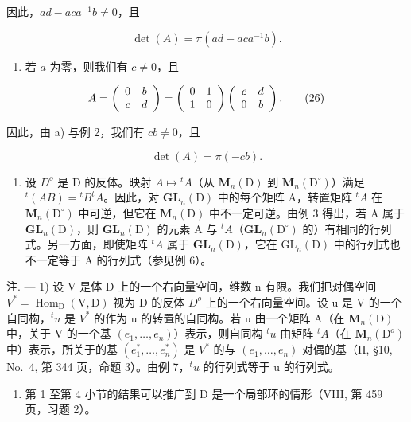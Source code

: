 因此，\(ad - aca^{-1}b \neq 0\)，且

\[
\det (A) = \pi (a d - a c a ^ {- 1} b).\tag{25}
\]

\begin{enumerate}
\def\labelenumi{\alph{enumi})}
\setcounter{enumi}{1}
\tightlist
\item
  若 \(a\) 为零，则我们有 \(c \neq 0\)，且
\end{enumerate}

\[
A = \left( \begin{array}{c c} 0 & b \\ c & d \end{array} \right) = \left( \begin{array}{c c} 0 & 1 \\ 1 & 0 \end{array} \right) \left( \begin{array}{c c} c & d \\ 0 & b \end{array} \right).\tag{26}
\]

因此，由 a) 与例 2，我们有 \(cb \neq 0\)，且

\[
\det (A) = \pi (- c b).\tag{27}
\]

\begin{enumerate}
\def\labelenumi{\arabic{enumi})}
\setcounter{enumi}{6}
\tightlist
\item
  设 \(D^{o}\) 是 D 的反体。映射 \(A \mapsto {}^{t}A\)（从 \(\mathbf{M}_{n}(\mathrm{D})\) 到 \(\mathbf{M}_{n}(\mathrm{D}^{\circ})\)）满足 \({}^{t}(AB) = {}^{t}B^{t}A\)。因此，对 \(\mathbf{GL}_{n}(\mathrm{D})\) 中的每个矩阵 A，转置矩阵 \({}^{t}A\) 在 \(\mathbf{M}_{n}(\mathrm{D}^{\circ})\) 中可逆，但它在 \(\mathbf{M}_{n}(\mathrm{D})\) 中不一定可逆。由例 3 得出，若 A 属于 \(\mathbf{GL}_{n}(\mathrm{D})\)，则 \(\mathbf{GL}_{n}(\mathrm{D})\) 的元素 A 与 \({}^{t}A\)（\(\mathbf{GL}_{n}(\mathrm{D}^{\circ})\) 的）有相同的行列式。另一方面，即使矩阵 \({}^{t}A\) 属于 \(\mathbf{GL}_{n}(\mathrm{D})\)，它在 \(\mathrm{GL}_{n}(\mathrm{D})\) 中的行列式也不一定等于 A 的行列式（参见例 6）。
\end{enumerate}

注. --- 1) 设 V 是体 D 上的一个右向量空间，维数 n 有限。我们把对偶空间 \(V^{*} = \operatorname{Hom}_{\mathrm{D}}(\mathrm{V}, \mathrm{D})\) 视为 D 的反体 \(D^{o}\) 上的一个右向量空间。设 u 是 V 的一个自同构，\(^{t}u\) 是 \(V^{*}\) 的作为 u 的转置的自同构。若 u 由一个矩阵 A（在 \(\mathbf{M}_{n}(\mathrm{D})\) 中，关于 V 的一个基 \((e_{1}, \ldots, e_{n})\)）表示，则自同构 \(^{t}u\) 由矩阵 \(^{t}A\)（在 \(\mathbf{M}_{n}(\mathrm{D}^{o})\) 中）表示，所关于的基 \((e_{1}^{*}, \ldots, e_{n}^{*})\) 是 \(V^{*}\) 的与 \((e_{1}, \ldots, e_{n})\) 对偶的基（II, §10, No.~4, 第 344 页，命题 3）。由例 7，\(^{t}u\) 的行列式等于 u 的行列式。

\begin{enumerate}
\def\labelenumi{\arabic{enumi})}
\setcounter{enumi}{1}
\tightlist
\item
  第 1 至第 4 小节的结果可以推广到 D 是一个局部环的情形（VIII, 第 459 页，习题 2）。
\end{enumerate}

